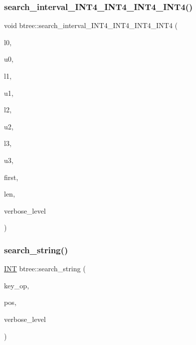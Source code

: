 \subsubsection{\texorpdfstring{search\+\_\+interval\+\_\+\+I\+N\+T4\+\_\+\+I\+N\+T4\+\_\+\+I\+N\+T4\+\_\+\+I\+N\+T4()}{search\_interval\_INT4\_INT4\_INT4\_INT4()}}
{\footnotesize\ttfamily void btree\+::search\+\_\+interval\+\_\+\+I\+N\+T4\+\_\+\+I\+N\+T4\+\_\+\+I\+N\+T4\+\_\+\+I\+N\+T4 (\begin{DoxyParamCaption}\item[{\mbox{\hyperlink{galois_8h_a09fddde158a3a20bd2dcadb609de11dc}{I\+NT}}}]{l0,  }\item[{\mbox{\hyperlink{galois_8h_a09fddde158a3a20bd2dcadb609de11dc}{I\+NT}}}]{u0,  }\item[{\mbox{\hyperlink{galois_8h_a09fddde158a3a20bd2dcadb609de11dc}{I\+NT}}}]{l1,  }\item[{\mbox{\hyperlink{galois_8h_a09fddde158a3a20bd2dcadb609de11dc}{I\+NT}}}]{u1,  }\item[{\mbox{\hyperlink{galois_8h_a09fddde158a3a20bd2dcadb609de11dc}{I\+NT}}}]{l2,  }\item[{\mbox{\hyperlink{galois_8h_a09fddde158a3a20bd2dcadb609de11dc}{I\+NT}}}]{u2,  }\item[{\mbox{\hyperlink{galois_8h_a09fddde158a3a20bd2dcadb609de11dc}{I\+NT}}}]{l3,  }\item[{\mbox{\hyperlink{galois_8h_a09fddde158a3a20bd2dcadb609de11dc}{I\+NT}}}]{u3,  }\item[{\mbox{\hyperlink{galois_8h_a09fddde158a3a20bd2dcadb609de11dc}{I\+NT}} \&}]{first,  }\item[{\mbox{\hyperlink{galois_8h_a09fddde158a3a20bd2dcadb609de11dc}{I\+NT}} \&}]{len,  }\item[{\mbox{\hyperlink{galois_8h_a09fddde158a3a20bd2dcadb609de11dc}{I\+NT}}}]{verbose\+\_\+level }\end{DoxyParamCaption})}

\mbox{\label{classbtree_a683397734819951c911ba7f5c35c8fac}} 
\subsubsection{\texorpdfstring{search\+\_\+string()}{search\_string()}}
{\footnotesize\ttfamily \mbox{\hyperlink{galois_8h_a09fddde158a3a20bd2dcadb609de11dc}{I\+NT}} btree\+::search\+\_\+string (\begin{DoxyParamCaption}\item[{\mbox{\hyperlink{classdiscreta__base}{discreta\+\_\+base}} \&}]{key\+\_\+op,  }\item[{\mbox{\hyperlink{galois_8h_a09fddde158a3a20bd2dcadb609de11dc}{I\+NT}} \&}]{pos,  }\item[{\mbox{\hyperlink{galois_8h_a09fddde158a3a20bd2dcadb609de11dc}{I\+NT}}}]{verbose\+\_\+level }\end{DoxyParamCaption})}

